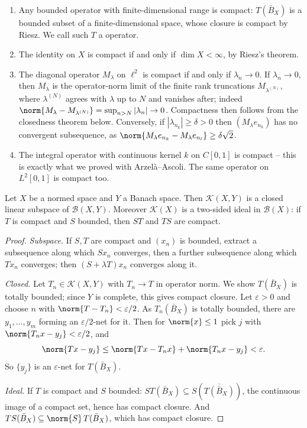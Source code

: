 \documentclass[a4paper]{scrartcl}
\newcommand{\Bop}{\mathcal{B}}
\newcommand{\Kop}{\mathcal{K}}
\begin{document}
\begin{example}
	\begin{enumerate}[label=(\roman*)]
		\item Any bounded operator with finite-dimensional range is compact: $T(\bar B_X)$ is a bounded subset of a finite-dimensional space, whose closure is compact by Riesz. We call such $T$ a  operator.
		\item The identity on $X$ is compact if and only if $\dim X<\infty$, by Riesz's theorem.
		\item The diagonal operator $M_\lambda$ on $\ell^2$ is compact if and only if $\lambda_n \to 0$. If $\lambda_n\to0$, then $M_\lambda$ is the operator-norm limit of the finite rank truncations $M_{\lambda^{(N)}}$, where $\lambda^{(N)}$ agrees with $\lambda$ up to $N$ and vanishes after; indeed $\norm{M_\lambda - M_{\lambda^{(N)}}} = \sup_{n>N}|\lambda_n|\to0$. Compactness then follows from the closedness theorem below. Conversely, if $|\lambda_{n_k}|\geq\delta>0$ then $(M_\lambda e_{n_k})$ has no convergent subsequence, as $\norm{M_\lambda e_{n_k}-M_\lambda e_{n_l}}\geq \delta\sqrt2$.
		\item The integral operator with continuous kernel $k$ on $C[0,1]$ is compact -- this is exactly what we proved with Arzelà--Ascoli. The same operator on $L^2[0,1]$ is compact too.
	\end{enumerate}
\end{example}

\begin{theorem}
	Let $X$ be a normed space and $Y$ a Banach space. Then $\Kop(X,Y)$ is a closed linear subspace of $\Bop(X,Y)$. Moreover $\Kop(X)$ is a two-sided ideal in $\Bop(X)$: if $T$ is compact and $S$ bounded, then $ST$ and $TS$ are compact.
\end{theorem}

\begin{proof}
	\emph{Subspace.} If $S,T$ are compact and $(x_n)$ is bounded, extract a subsequence along which $Sx_n$ converges, then a further subsequence along which $Tx_n$ converges; then $(S+\lambda T)x_n$ converges along it.

	\emph{Closed.} Let $T_n\in\Kop(X,Y)$ with $T_n\to T$ in operator norm. We show $T(\bar B_X)$ is totally bounded; since $Y$ is complete, this gives compact closure. Let $\varepsilon>0$ and choose $n$ with $\norm{T-T_n}<\varepsilon/2$. As $T_n(\bar B_X)$ is totally bounded, there are $y_1,\dots,y_m$ forming an $\varepsilon/2$-net for it. Then for $\norm{x}\leq1$ pick $j$ with $\norm{T_nx - y_j}<\varepsilon/2$, and
	$$\norm{Tx - y_j}\leq\norm{Tx-T_nx}+\norm{T_nx-y_j}<\varepsilon.$$
	So $\{y_j\}$ is an $\varepsilon$-net for $T(\bar B_X)$.

	\emph{Ideal.} If $T$ is compact and $S$ bounded: $ST(\bar B_X) \subseteq S(\overline{T(\bar B_X)})$, the continuous image of a compact set, hence has compact closure. And $TS(\bar B_X)\subseteq \norm{S}\, T(\bar B_X)$, which has compact closure.
\end{proof}
\end{document}
